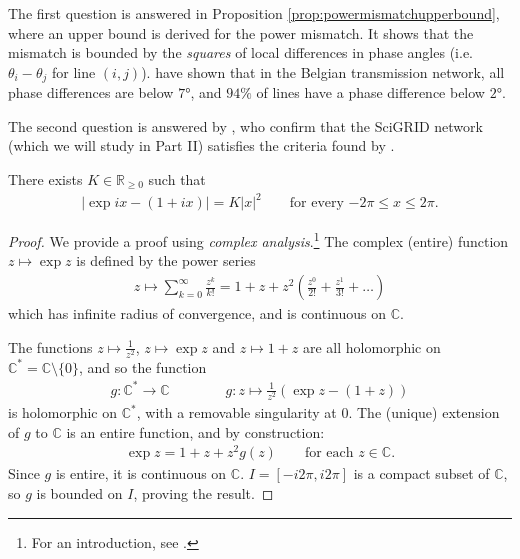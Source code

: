 \documentclass[main.tex]{subfiles}
\begin{document}
The first question is answered in Proposition \ref{prop:powermismatchupperbound}, where an upper bound is derived for the power mismatch. It shows that the mismatch is bounded by the \emph{squares} of local differences in phase angles (i.e. $\theta_i - \theta_j$ for line $(i,j)$). \citet{Purchala} have shown that in the Belgian transmission network, all phase differences are below $7 \si{\degree}$, and $94\si{\percent}$ of lines have a phase difference below $2\si{\degree}$.

The second question is answered by \cite{Nesti2018emergentfailures}, who confirm that the SciGRID network (which we will study in Part II) satisfies the criteria found by \cite{Purchala}.

\begin{lemma}\label{lem:expaprrox}%
There exists $K \in \mathbb{R}_{\geq 0}$ such that
\begin{align*}
    |\exp ix - (1 + ix)| = K |x|^2 \qquad \text{for every $-2\pi \leq x \leq 2\pi$}.
\end{align*}
\end{lemma}%

\begin{proof}
We provide a proof using \emph{complex analysis}.\footnote{For an introduction, see \cite{GarlingVolIII}.} The complex (entire) function $z \mapsto \exp z$ is defined by the power series
\begin{align*}
    z\mapsto \sum_{k=0}^{\infty} \frac{z^k}{k!} = 1 + z + z^2\left(\frac{z^0}{2!}+\frac{z^1}{3!}+\dots\right)
\end{align*}%
which has infinite radius of convergence, and is continuous on $\mathbb{C}$.

The functions $z \mapsto \frac{1}{z^2}$, $z \mapsto \exp z$ and $z \mapsto 1+z$ are all holomorphic on $\mathbb{C}^*=\mathbb{C} \setminus \{0\}$, and so the function
\begin{align}
    g: \mathbb{C}^* \rightarrow \mathbb{C} \qquad \qquad
    g: z \mapsto \frac{1}{z^2}(\exp z - (1+z))
\end{align}
is holomorphic on $\mathbb{C}^*$, with a removable singularity at $0$. The (unique) extension of $g$ to $\mathbb{C}$ is an entire function, and by construction:
\begin{align*}
    \exp z = 1 + z + z^2g(z)\qquad \text{for each $z \in \mathbb{C}$}.
\end{align*}
Since $g$ is entire, it is continuous on $\mathbb{C}$.
$I=[-i2\pi, i2\pi]$ is a compact subset of $\mathbb{C}$, so $g$ is bounded on $I$, proving the result.
\end{proof}
\end{document}
